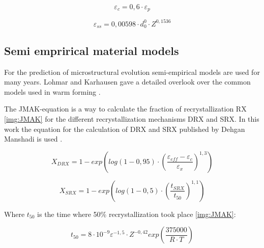\begin{equation}
 \varepsilon_{c} = 0,6\cdot\varepsilon_{p}
\end{equation}

\begin{equation}
 \varepsilon_{ss} = 0,00598\cdot d_{0}^{0}\cdot Z^{0,1536}
\end{equation}

\subsection{Semi emprirical material models}
For the prediction of microstructural evolution semi-empirical models are used for many years. Lohmar and Karhausen gave a detailed overlook over the common models used in warm forming \cite{LOH10}\cite{KAR94}.\par


The JMAK-equation is a way to calculate the fraction of recrystallization RX \ref{img:JMAK} for the different recrystallization mechanisms DRX and SRX. In this work the equation for the calculation of DRX and SRX published by Dehgan Manshadi is used \cite{DEH08}.

\begin{equation}
 X_{DRX} = 1 - exp\left( log\left( 1-0,95\right) \cdot\left( \frac{\varepsilon_{eff}-\varepsilon_{c}}{\varepsilon_{x}}\right) ^{1,3}\right)
\end{equation}

\begin{equation}
 X_{SRX} = 1 - exp\left( log\left( 1-0,5\right) \cdot\left( \frac{t_{SRX}}{t_{50}}\right) ^{1,1}\right)
\end{equation}

Where $t_{50}$ is the time where 50\% recrystallization took place \ref{img:JMAK}:

\begin{equation}
 t_{50} = 8\cdot10^{-9}\varepsilon^{-1,5}\cdot Z^{-0,42}exp\left( \frac{375000}{R\cdot T}\right)
\end{equation}

